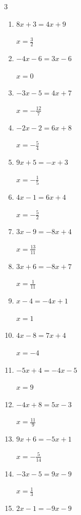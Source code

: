 \begin{multicols}{3}
\begin{enumerate}
  \item $8x+3=4x+9$

        $\displaystyle x=\frac{3}{2}$

  \item $-4x-6=3x-6$

        $\displaystyle x=0$

  \item $-3x-5=4x+7$

        $\displaystyle x=-\frac{12}{7}$

  \item $-2x-2=6x+8$

        $\displaystyle x=-\frac{5}{4}$

  \item $9x+5=-x+3$

        $\displaystyle x=-\frac{1}{5}$

  \item $4x-1=6x+4$

        $\displaystyle x=-\frac{5}{2}$

  \item $3x-9=-8x+4$

        $\displaystyle x=\frac{13}{11}$

  \item $3x+6=-8x+7$

        $\displaystyle x=\frac{1}{11}$

  \item $x-4=-4x+1$

        $\displaystyle x=1$

  \item $4x-8=7x+4$

        $\displaystyle x=-4$

  \item $-5x+4=-4x-5$

        $\displaystyle x=9$

\columnbreak %

  \item $-4x+8=5x-3$

        $\displaystyle x=\frac{11}{9}$

  \item $9x+6=-5x+1$

        $\displaystyle x=-\frac{5}{14}$

  \item $-3x-5=9x-9$

        $\displaystyle x=\frac{1}{3}$

  \item $2x-1=-9x-9$


\end{enumerate}
\end{multicols}

